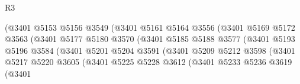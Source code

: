 \begin{lexlean}{R3}
\begin{coremodule}
                                        (@3401
                                          @5153
                                          @5156
                                          @3549
                                          (@3401
                                            @5161
                                            @5164
                                            @3556
                                            (@3401
                                              @5169
                                              @5172
                                              @3563
                                              (@3401
                                                @5177
                                                @5180
                                                @3570
                                                (@3401
                                                  @5185
                                                  @5188
                                                  @3577
                                                  (@3401
                                                    @5193
                                                    @5196
                                                    @3584
                                                    (@3401
                                                      @5201
                                                      @5204
                                                      @3591
                                                      (@3401
                                                        @5209
                                                        @5212
                                                        @3598
                                                        (@3401
                                                          @5217
                                                          @5220
                                                          @3605
                                                          (@3401
                                                            @5225
                                                            @5228
                                                            @3612
                                                            (@3401
                                                              @5233
                                                              @5236
                                                              @3619
                                                              (@3401

\end{coremodule}
\end{lexlean}
